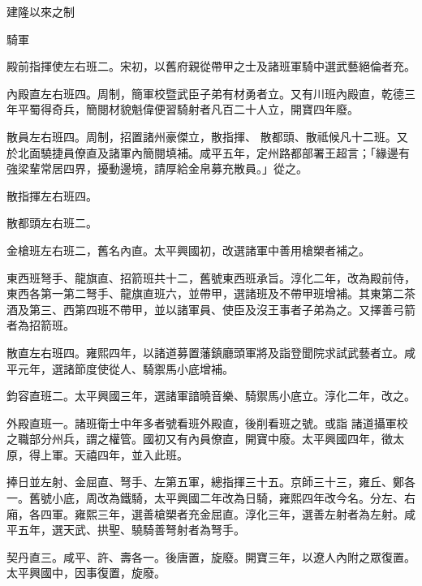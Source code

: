 \begin{pinyinscope}
 建隆以來之制



 騎軍



 殿前指揮使左右班二。宋初，以舊府親從帶甲之士及諸班軍騎中選武藝絕倫者充。



 內殿直左右班四。周制，簡軍校暨武臣子弟有材勇者立。又有川班內殿直，乾德三年平蜀得奇兵，簡閱材貌魁偉便習騎射者凡百二十人立，開寶四年廢。



 散員左右班四。周制，招置諸州豪傑立，散指揮、
 散都頭、散祗候凡十二班。又於北面驍捷員僚直及諸軍內簡閱填補。咸平五年，定州路都部署王超言；「緣邊有強梁輩常居四界，擾動邊境，請厚給金帛募充散員。」從之。



 散指揮左右班四。



 散都頭左右班二。



 金槍班左右班二，舊名內直。太平興國初，改選諸軍中善用槍槊者補之。



 東西班弩手、龍旗直、招箭班共十二，舊號東西班承旨。淳化二年，改為殿前侍，東西各第一第二弩手、龍旗直班六，並帶甲，選諸班及不帶甲班增補。其東第二茶酒及第三、西第四班不帶甲，並以諸軍員、使臣及沒王事者子弟為之。又擇善弓箭者為招箭班。



 散直左右班四。雍熙四年，以諸道募置藩鎮廳頭軍將及詣登聞院求試武藝者立。咸平元年，選諸節度使從人、騎禦馬小底增補。



 鈞容直班二。太平興國三年，選諸軍諳曉音樂、騎禦馬小底立。淳化二年，改之。



 外殿直班一。諸班衛士中年多者號看班外殿直，後削看班之號。或詣
 諸道攝軍校之職部分州兵，謂之權管。國初又有內員僚直，開寶中廢。太平興國四年，徵太原，得上軍。天禧四年，並入此班。



 捧日並左射、金屈直、弩手、左第五軍，總指揮三十五。京師三十三，雍丘、鄭各一。舊號小底，周改為鐵騎，太平興國二年改為日騎，雍熙四年改今名。分左、右廂，各四軍。雍熙三年，選善槍槊者充金屈直。淳化三年，選善左射者為左射。咸平五年，選天武、拱聖、驍騎善弩射者為弩手。



 契丹直三。咸平、許、壽各一。後唐置，旋廢。開寶三年，以遼人內附之眾復置。太平興國中，因事復置，旋廢。




\end{pinyinscope}
